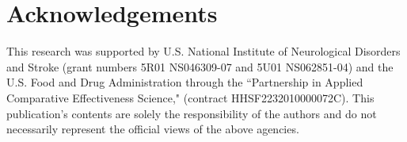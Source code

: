 \documentclass[article]{jss}
\begin{document}
\section*{Acknowledgements}
\label{sec:acknowledgements}
This research was supported by U.S. National Institute of Neurological Disorders and Stroke (grant numbers 5R01 NS046309-07 and 5U01 NS062851-04) and
the U.S.  Food and Drug Administration through the ``Partnership in Applied Comparative Effectiveness Science," (contract HHSF2232010000072C).
This publication's contents are solely the responsibility of the authors and do not necessarily represent the official views of the above agencies.




\end{document}
